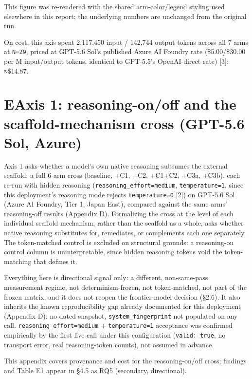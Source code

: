 \documentclass[
  10pt,
]{article}
\begin{document}
This figure was re-rendered with the shared arm-color/legend styling used elsewhere in this report; the underlying numbers are unchanged from the original run.

On cost, this axis spent 2,117,450 input / 142,744 output tokens across all 7 arms at \texttt{N=29}, priced at GPT-5.6 Sol's published Azure AI Foundry rate (\$5.00/\$30.00 per M input/output tokens, identical to GPT-5.5's OpenAI-direct rate) {[}3{]}: ≈\$14.87.

\section{E\quad Axis 1: reasoning-on/off and the scaffold-mechanism cross (GPT-5.6 Sol, Azure)}\label{e-axis-1-reasoning-onoff-and-the-scaffold-mechanism-cross-gpt-5.6-sol-azure}

Axis 1 asks whether a model's own native reasoning subsumes the external scaffold: a full 6-arm cross (baseline, +C1, +C2, +C1+C2, +C3a, +C3b), each re-run with hidden reasoning (\texttt{reasoning\_effort=\textquotesingle{}medium\textquotesingle{}}, \texttt{temperature=1}, since this deployment's reasoning mode rejects \texttt{temperature=0} {[}2{]}) on GPT-5.6 Sol (Azure AI Foundry, Tier 1, Japan East), compared against the same arms' reasoning-off results (Appendix D). Formalizing the cross at the level of each individual scaffold mechanism, rather than the scaffold as a whole, asks whether native reasoning substitutes for, remediates, or complements each one separately. The token-matched control is excluded on structural grounds: a reasoning-on control column is uninterpretable, since hidden reasoning tokens void the token-matching that defines it.

Everything here is directional signal only: a different, non-same-pass measurement regime, not determinism-frozen, not token-matched, not part of the frozen matrix, and it does not reopen the frontier-model decision (§2.6). It also inherits the known reproducibility gap already documented for this deployment (Appendix D): no dated snapshot, \texttt{system\_fingerprint} not populated on any call. \texttt{reasoning\_effort=\textquotesingle{}medium\textquotesingle{}} + \texttt{temperature=1} acceptance was confirmed empirically by the first live call under this configuration (\texttt{valid:\ true}, no transport error, real reasoning-token counts), not assumed in advance.

This appendix covers provenance and cost for the reasoning-on/off cross; findings and Table E1 appear in §4.5 as RQ5 (secondary, directional).
\end{document}
